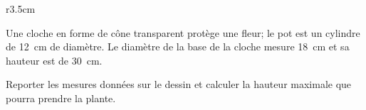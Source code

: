 
\begin{exercice}\label{exo2smath-0183}


\begin{wrapfigure}{r}{3.5cm}
   \vspace{-0.5cm}        %
   \centering
   
\end{wrapfigure}

Une cloche en forme de cône transparent protège une fleur; le pot est un cylindre de \SI{12}{\centi\meter} de diamètre. Le diamètre de la base de la cloche mesure \SI{18}{\centi\meter} et sa hauteur est de \SI{30}{\centi\meter}.

Reporter les mesures données sur le dessin et calculer la hauteur maximale que pourra prendre la plante.

\end{exercice}
